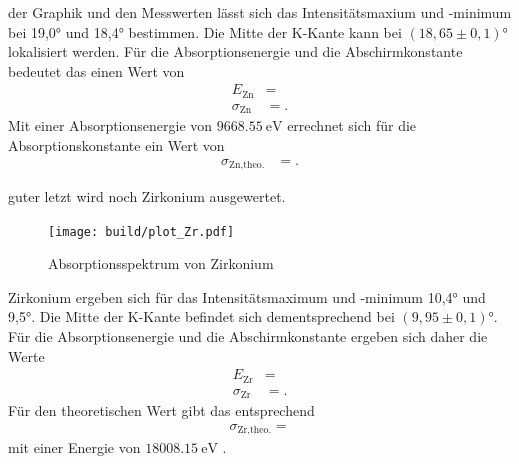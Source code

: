 \justifying der Graphik und den Messwerten lässt sich das Intensitätsmaxium und 
-minimum bei 19,0° und 18,4° bestimmen.
Die Mitte der K-Kante kann bei $(18,65\pm 0,1)° $ lokalisiert werden.
Für die Absorptionsenergie und die Abschirmkonstante bedeutet das einen Wert von
\begin{align}
    E_{\text{Zn}} &= \text{} \label{eq:39}\\
    \sigma _{\text{Zn}} &= \text{} \label{eq:40}.
\end{align}
Mit einer Absorptionsenergie von $\SI{9668.55}{\electronvolt} $ \cite{NIST} errechnet
sich für die Absorptionskonstante ein Wert von
\begin{align}
    \sigma _{\text{Zn,theo.}}&= \text{} \label{eq:41}.
\end{align}


\justifying guter letzt wird noch Zirkonium ausgewertet.


\begin{figure}[H]
    \centering
    \texttt{[image: build/plot\_Zr.pdf]}
    \caption{Absorptionsspektrum von Zirkonium\cite{matplotlib}}
    \label{fig:9}
\end{figure}
\justifying Zirkonium ergeben sich für das Intensitätsmaximum und -minimum
10,4° und 9,5°.
Die Mitte der K-Kante befindet sich dementsprechend bei $(9,95\pm 0,1)°$.
Für die Absorptionsenergie und die Abschirmkonstante ergeben sich daher
die Werte
\begin{align}
    E_{\text{Zr}} &= \text{} \label{eq:42} \\
    \sigma _{\text{Zr}} &= \text{} \label{eq:43}.
\end{align}
Für den theoretischen Wert gibt das entsprechend
\begin{align}
    \sigma _{\text{Zr,theo.}} = \text{} \label{eq:44}
\end{align}
mit einer Energie von $\SI{18008.15}{\electronvolt} $ \cite{NIST}.


